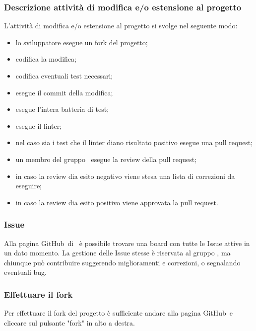         \subsubsection{Descrizione attività di modifica e/o estensione al progetto}
        L'attività di modifica e/o estensione al progetto si svolge nel seguente modo:
        \begin{itemize}
            \item lo sviluppatore esegue un fork del progetto;
            \item codifica la modifica;
            \item codifica eventuali test necessari;
            \item esegue il commit della modifica;
            \item esegue l'intera batteria di test;
            \item esegue il linter;
            \item nel caso sia i test che il linter diano risultato positivo esegue una pull request;
            \item un membro del gruppo \cod\ esegue la review della pull request;
            \item in caso la review dia esito negativo viene stesa una lista di correzioni da eseguire;
            \item in caso la review dia esito positivo viene approvata la pull request.
        \end{itemize}
        \subsubsection{Issue}
        Alla pagina GitHub\glo\ di \hd\ è possibile trovare una board con tutte le Issue attive in un dato momento. La gestione delle Issue stesse è riservata al gruppo \cod , ma chiunque può contribuire suggerendo miglioramenti e correzioni, o segnalando eventuali bug. 
        \subsubsection{Effettuare il fork}
        Per effettuare il fork del progetto è sufficiente andare alla pagina GitHub\glo\ e cliccare sul pulsante "fork" in alto a destra.

